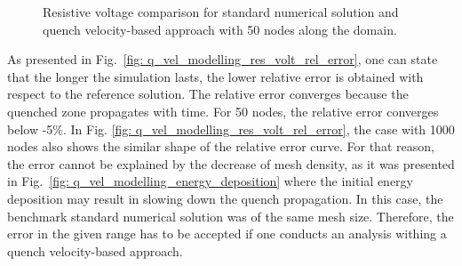\begin{figure}[H]
\centering
    \caption{Resistive voltage comparison for standard numerical solution and quench velocity-based approach with 50 nodes along the domain.}
    \label{fig: q_vel_modelling_res_volt_benchmarking}
\end{figure}

As presented in Fig.~\ref{fig: q_vel_modelling_res_volt_rel_error}, one can state that the longer the simulation lasts, the lower relative error is obtained with respect to the reference solution. The relative error converges because the quenched zone propagates with time. For 50 nodes, the relative error converges below -5\%.
In Fig. \ref{fig: q_vel_modelling_res_volt_rel_error}, the case with 1000 nodes also shows the similar shape of the relative error curve. For that reason, the error cannot be explained by the decrease of mesh density, as it was presented in Fig.~\ref{fig: q_vel_modelling_energy_deposition} where the initial energy deposition may result in slowing down the quench propagation. In this case, the benchmark standard numerical solution was of the same mesh size. Therefore, the error in the given range has to be accepted if one conducts an analysis withing a quench velocity-based approach.

